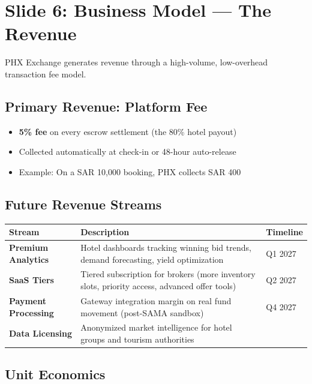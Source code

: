 \documentclass[11pt,a4paper]{article}
\providecommand{\tightlist}{%
  \setlength{\itemsep}{0pt}\setlength{\parskip}{0pt}}
\begin{document}
\section*{Slide 6: Business Model --- The Revenue}

PHX Exchange generates revenue through a high-volume, low-overhead transaction fee model.

\subsection*{Primary Revenue: Platform Fee}
\begin{itemize}
\tightlist
\item \textbf{5\% fee} on every escrow settlement (the 80\% hotel payout)
\item Collected automatically at check-in or 48-hour auto-release
\item Example: On a SAR 10,000 booking, PHX collects SAR 400
\end{itemize}

\subsection*{Future Revenue Streams}

\begin{center}
\begin{tabular}{|>{\raggedright\arraybackslash}p{3.5cm}|>{\raggedright\arraybackslash}p{7.5cm}|>{\raggedright\arraybackslash}p{2.5cm}|}
\hline
\rowcolor{headergray}
\textbf{Stream} & \textbf{Description} & \textbf{Timeline} \\
\hline
\textbf{Premium Analytics} & Hotel dashboards tracking winning bid trends, demand forecasting, yield optimization & Q1 2027 \\
\hline
\textbf{SaaS Tiers} & Tiered subscription for brokers (more inventory slots, priority access, advanced offer tools) & Q2 2027 \\
\hline
\textbf{Payment Processing} & Gateway integration margin on real fund movement (post-SAMA sandbox) & Q4 2027 \\
\hline
\textbf{Data Licensing} & Anonymized market intelligence for hotel groups and tourism authorities & 2028 \\
\hline
\end{tabular}
\end{center}

\subsection*{Unit Economics}
\end{document}
